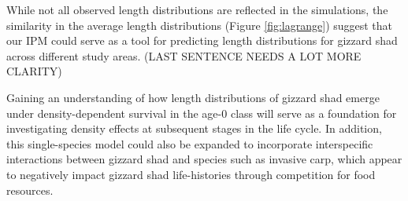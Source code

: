 \documentclass[preprint,review,12pt,authoryear]{elsarticle}
\begin{document}
While not all observed length distributions are reflected in the simulations, the similarity in the average length distributions (Figure \ref{fig:lagrange}) suggest that our IPM could serve as a tool for predicting length distributions for gizzard shad across different study areas. (LAST SENTENCE NEEDS A LOT MORE CLARITY)

Gaining an understanding of how length distributions of gizzard shad emerge under density-dependent survival in the age-0 class will serve as a foundation for investigating density effects at subsequent stages in the life cycle.  
In addition, this single-species model could also be expanded to incorporate interspecific interactions between gizzard shad and species such as invasive carp, which appear to negatively impact gizzard shad life-histories through competition for food resources.   

\end{document}
